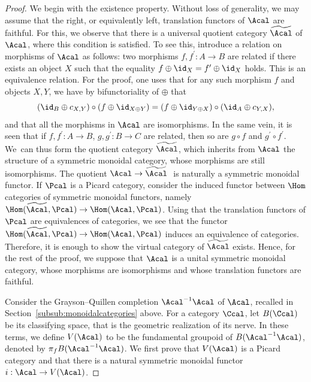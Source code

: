 \begin{proof}
We begin with the existence property. Without loss of generality, we may assume that the right, or equivalently left, translation functors of $\Acal$ are faithful. For this, we observe that there is a universal quotient category $\widetilde{\Acal}$ of $\Acal$, where this condition is satisfied. To see this, introduce a relation on morphisms of $\Acal$ as follows: two morphisms $f,f^{\prime}\colon A\to B$ are related if there exists an object $X$ such that the equality $f\oplus\id_{X}=f^{\prime}\oplus\id_{X}$ holds. This is an equivalence relation. For the proof, one uses that for any such morphism $f$ and objects $X,Y$, we have by bifunctoriality of $\oplus$ that
\begin{displaymath}
(\id_{B}\oplus c_{X,Y})\circ (f\oplus\id_{X\oplus Y})=(f\oplus\id_{Y\oplus X})\circ (\id_{A}\oplus c_{Y,X}),
\end{displaymath}
and that all the morphisms in $\Acal$ are isomorphisms. In the same vein, it is seen that if $f, f^{\prime}\colon A\to B$, \resp $g,g^{\prime}\colon B\to C$ are related, then so are $g\circ f$ and $g^{\prime}\circ f^{\prime}$. We~can thus form the quotient category $\widetilde{\Acal}$, which inherits from $\Acal$ the structure of a symmetric monoidal category, whose morphisms are still isomorphisms. The quotient $\Acal\to\widetilde{\Acal}\ $ is naturally a symmetric monoidal functor. If $\Pcal$ is a Picard category, consider the induced functor between $\Hom$ categories of symmetric monoidal functors, namely $\Hom(\widetilde{\Acal},\Pcal)\to\Hom(\Acal,\Pcal)$. Using that the translation functors of $\Pcal$ are equivalences of categories, we see that the functor $\Hom(\widetilde{\Acal},\Pcal)\to\Hom(\Acal,\Pcal)$ induces an equivalence of categories. Therefore, it is enough to show the virtual category of $\widetilde{\Acal}$ exists. Hence, for the rest of the proof, we suppose that $\Acal$ is a unital symmetric monoidal category, whose morphisms are isomorphisms and whose translation functors are faithful.

Consider the Grayson--Quillen completion $\Acal^{-1} \Acal$ of $\Acal$, recalled in Section~\ref{subsub:monoidalcategories} above. For a category $\Ccal$, let $B(\Ccal)$ be its classifying space, that is the geometric realization of its nerve. In these terms, we define $V(\Acal)$ to be the fundamental groupoid of $B(\Acal^{-1} \Acal)$, denoted by $\pi_{f}B(\Acal^{-1} \Acal)$. We first prove that $V(\Acal)$ is a Picard category and that there is a natural symmetric monoidal functor $i: \Acal \to V(\Acal)$.


\end{proof}
